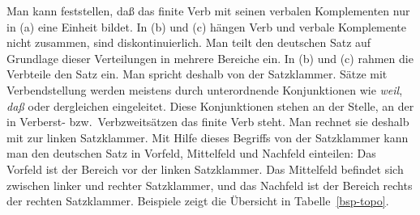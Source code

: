 Man kann feststellen, daß das finite Verb mit seinen verbalen 
Komplementen nur in (a) eine Einheit bildet.
In (b) und (c) hängen Verb und verbale Komplemente 
nicht zusammen, sind diskontinuierlich.
Man teilt den deutschen Satz auf Grundlage dieser Verteilungen 
in mehrere Bereiche ein. In (b) und (c) rahmen 
die Verbteile den Satz ein. Man spricht deshalb von der Satzklammer.
Sätze mit Verbendstellung werden meistens durch unterordnende Konjunktionen
wie \emph{weil}, \emph{daß} oder dergleichen
eingeleitet. Diese Konjunktionen stehen an der Stelle, an der
in Verberst- bzw.\ Verbzweitsätzen das finite Verb steht. Man rechnet sie
deshalb mit zur linken Satzklammer.
Mit Hilfe dieses Begriffs von der Satzklammer kann man den deutschen Satz 
in Vorfeld, Mittelfeld und Nachfeld einteilen: Das Vorfeld ist der Bereich
vor der linken Satzklammer. Das Mittelfeld befindet sich zwischen linker und rechter
Satzklammer, und das Nachfeld ist der Bereich rechts der rechten Satzklammer.
Beispiele zeigt die Übersicht in Tabelle~\vref{bsp-topo}.
{}
